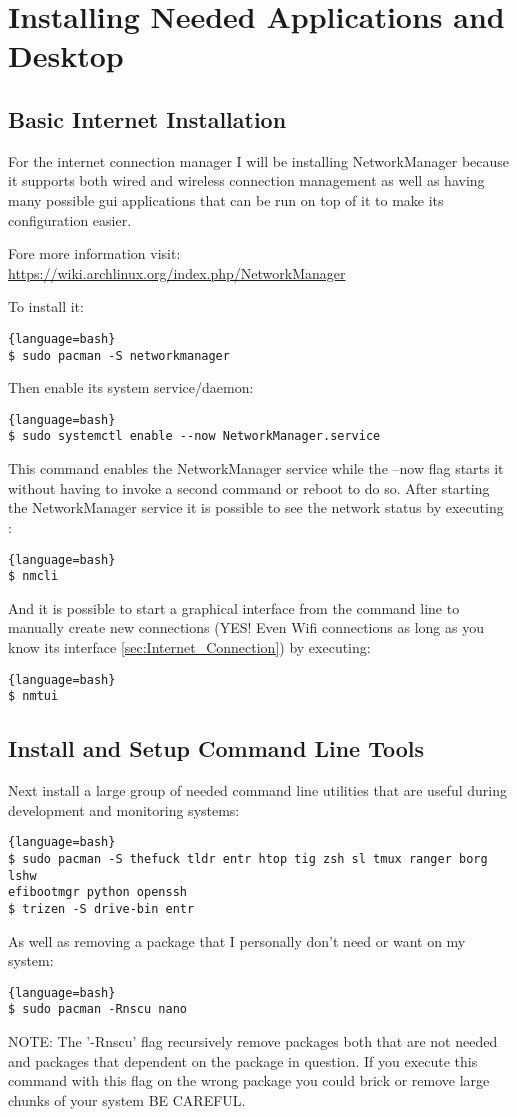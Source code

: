 \section{Installing Needed Applications and Desktop}
\subsection{Basic Internet Installation}
For the internet connection manager I will be installing NetworkManager because it supports both wired and wireless connection management as well as having many possible gui applications that can be run on top of it to make its configuration easier.

Fore more information visit: \url{https://wiki.archlinux.org/index.php/NetworkManager}

To install it:
\begin{lstlisting}{language=bash}
$ sudo pacman -S networkmanager
\end{lstlisting}
Then enable its system service/daemon:
\begin{lstlisting}{language=bash}
$ sudo systemctl enable --now NetworkManager.service
\end{lstlisting}
This command enables the NetworkManager service while the --now flag starts it without having to invoke a second command or reboot to do so.
After starting the NetworkManager service it is possible to see the network status by executing :
\begin{lstlisting}{language=bash}
$ nmcli
\end{lstlisting}
And it is possible to start a graphical interface from the command line to manually create new connections (YES! Even Wifi connections as long as you know its interface \ref{sec:Internet_Connection}) by executing:
\begin{lstlisting}{language=bash}
$ nmtui
\end{lstlisting}

\subsection{Install and Setup Command Line Tools}
Next install a large group of needed command line utilities that are useful during development and monitoring systems:
\begin{lstlisting}{language=bash}
$ sudo pacman -S thefuck tldr entr htop tig zsh sl tmux ranger borg lshw 
efibootmgr python openssh
$ trizen -S drive-bin entr
\end{lstlisting}
As well as removing a package that I personally don't need or want on my system:
\begin{lstlisting}{language=bash}
$ sudo pacman -Rnscu nano
\end{lstlisting}
NOTE: The '-Rnscu' flag recursively remove packages both that are not needed and packages that dependent on the package in question. If you execute this command with this flag on the wrong package you could brick or remove large chunks of your system BE CAREFUL.

